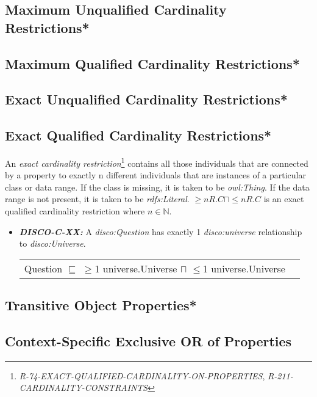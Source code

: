 \documentclass{llncs}
\newenvironment{DL}{
  \vspace{0cm}
  \begin{tabular}{r l}

}{
  \end{tabular}
}
\begin{document}
\subsection{Maximum Unqualified Cardinality Restrictions*}

\subsection{Maximum Qualified Cardinality Restrictions*}

\subsection{Exact Unqualified Cardinality Restrictions*}

\subsection{Exact Qualified Cardinality Restrictions*}

An \emph{exact cardinality restriction}\footnote{{\em R-74-EXACT-QUALIFIED-CARDINALITY-ON-PROPERTIES}, {\em R-211-CARDINALITY-CONSTRAINTS}} contains all those individuals that are connected by a property to exactly n different individuals that are instances of a particular class or data range. 
If the class is missing, it is taken to be \emph{owl:Thing}. 
If the data range is not present, it is taken to be \emph{rdfs:Literal}.
$\geq n R. C \sqcap \leq n R. C $ is an exact qualified cardinality restriction where $n \in \mathbb{N}$.

\begin{itemize}
	\item \textbf{{\em DISCO-C-XX:}}
A {\em disco:Question} has exactly 1 {\em disco:universe} relationship to {\em disco:Universe}.

\begin{DL}
Question $\sqsubseteq$ $\geq$1 universe.Universe $\sqcap$ $\leq$1 universe.Universe \\
\end{DL}
\end{itemize}

\subsection{Transitive Object Properties*}

\subsection{Context-Specific Exclusive OR of Properties}		
\end{document}
